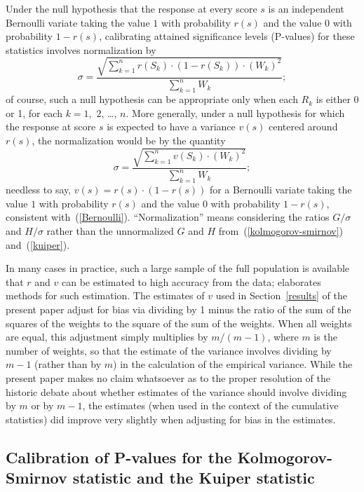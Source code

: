 \documentclass[12pt]{article}
\begin{document}
Under the null hypothesis that the response at every score $s$
is an independent Bernoulli variate taking the value $1$
with probability $r(s)$ and the value $0$ with probability $1-r(s)$,
calibrating attained significance levels (P-values) for these statistics
involves normalization by
%
\begin{equation}
\label{Bernoulli}
\sigma = \frac{\sqrt{\sum_{k=1}^n r(S_k) \cdot (1-r(S_k)) \cdot (W_k)^2}}
              {\sum_{k=1}^n W_k};
\end{equation}
%
of course, such a null hypothesis can be appropriate
only when each $R_k$ is either 0 or 1, for each $k = 1$,~$2$, \dots, $n$.
More generally, under a null hypothesis for which the response at score $s$
is expected to have a variance $v(s)$ centered around $r(s)$,
the normalization would be by the quantity
%
\begin{equation}
\label{general}
\sigma = \frac{\sqrt{\sum_{k=1}^n v(S_k) \cdot (W_k)^2}}{\sum_{k=1}^n W_k};
\end{equation}
%
needless to say, $v(s) = r(s) \cdot (1-r(s))$ for a Bernoulli variate
taking the value $1$ with probability $r(s)$
and the value $0$ with probability $1-r(s)$, consistent with~(\ref{Bernoulli}).
``Normalization'' means considering the ratios $G/\sigma$ and $H/\sigma$
rather than the unnormalized $G$ and $H$
from~(\ref{kolmogorov-smirnov}) and~(\ref{kuiper}).

In many cases in practice, such a large sample of the full population
is available that $r$ and $v$ can be estimated to high accuracy from the data;
\citet{tygert_full} elaborates methods for such estimation. The estimates
of $v$ used in Section~\ref{results} of the present paper adjust for bias
via dividing by 1 minus the ratio of the sum of the squares of the weights
to the square of the sum of the weights.
When all weights are equal, this adjustment simply multiplies by $m / (m - 1)$,
where $m$ is the number of weights,
so that the estimate of the variance involves dividing by $m-1$
(rather than by $m$) in the calculation of the empirical variance.
While the present paper makes no claim whatsoever as to the proper resolution
of the historic debate about whether estimates of the variance
should involve dividing by $m$ or by $m-1$, the estimates (when used
in the context of the cumulative statistics) did improve very slightly
when adjusting for bias in the estimates.



\subsection{Calibration of P-values for the Kolmogorov-Smirnov statistic
and the Kuiper statistic}
\label{calibration}
\end{document}
